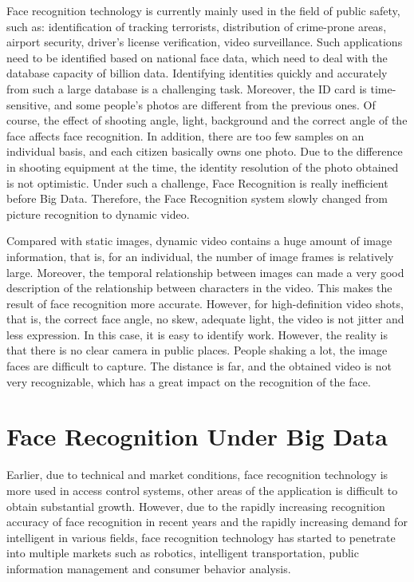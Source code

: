 \documentclass[sigconf]{acmart}
\begin{document}
Face recognition technology is currently mainly used in the field of public safety, such as: identification of tracking terrorists, distribution of crime-prone areas, airport security, driver's license verification, video surveillance. Such applications need to be identified based on national face data, which need to deal with the database capacity of billion data. Identifying identities quickly and accurately from such a large database is a challenging task.  Moreover, the ID card is time-sensitive, and some people's photos are different from the previous ones. Of course, the effect of shooting angle, light, background and the correct angle of the face affects face recognition. In addition, there are too few samples on an individual basis, and each citizen basically owns one photo. Due to the difference in shooting equipment at the time, the identity resolution of the photo obtained is not optimistic. Under such a challenge, Face Recognition is really inefficient before Big Data. Therefore, the Face Recognition system slowly changed from picture recognition to dynamic video.

Compared with static images, dynamic video contains a huge amount of image information, that is, for an individual, the number of image frames is relatively large. Moreover, the temporal relationship between images can made a very good description of the relationship between characters in the video. This makes the result of face recognition more accurate. However, for  high-definition video shots, that is, the correct face angle, no skew, adequate light, the video is not jitter and less expression. In this case, it is easy to identify work. However, the reality is that there is no clear camera in public places. People shaking a lot, the image faces are difficult to capture. The distance is far, and the obtained video is not very recognizable, which has a great impact on the recognition of the face\cite{crime}.



\section{Face Recognition Under Big Data}
Earlier, due to technical and market conditions, face recognition technology is more used in access control systems, other areas of the application is difficult to obtain substantial growth. However, due to the rapidly increasing recognition accuracy of face recognition in recent years and the rapidly increasing demand for intelligent in various fields, face recognition technology has started to penetrate into multiple markets such as robotics, intelligent transportation, public information management and consumer behavior analysis.
\end{document}
